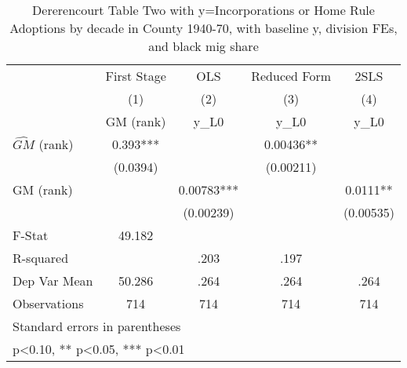 \begin{table}[htbp]\centering
\def\sym#1{\ifmmode^{#1}\else\(^{#1}\)\fi}
\caption{Dererencourt Table Two with y=Incorporations or Home Rule Adoptions by decade in County 1940-70, with baseline y, division FEs, and black mig share}
\begin{tabular}{l*{4}{c}}
\toprule
                    & First Stage   &         OLS   &Reduced Form   &        2SLS   \\
                    &\multicolumn{1}{c}{(1)}&\multicolumn{1}{c}{(2)}&\multicolumn{1}{c}{(3)}&\multicolumn{1}{c}{(4)}\\
                    &\multicolumn{1}{c}{GM  (rank)}&\multicolumn{1}{c}{y\_L0}&\multicolumn{1}{c}{y\_L0}&\multicolumn{1}{c}{y\_L0}\\
\midrule
$\hat{GM}$ (rank)   &       0.393***&               &     0.00436** &               \\
                    &    (0.0394)   &               &   (0.00211)   &               \\
\addlinespace
GM  (rank)          &               &     0.00783***&               &      0.0111** \\
                    &               &   (0.00239)   &               &   (0.00535)   \\
\midrule
F-Stat              &      49.182   &               &               &               \\
R-squared           &               &        .203   &        .197   &               \\
Dep Var Mean        &      50.286   &        .264   &        .264   &        .264   \\
Observations        &         714   &         714   &         714   &         714   \\
\bottomrule
\multicolumn{5}{l}{\footnotesize Standard errors in parentheses}\\
\multicolumn{5}{l}{\footnotesize * p<0.10, ** p<0.05, *** p<0.01}\\
\end{tabular}
\end{table}
